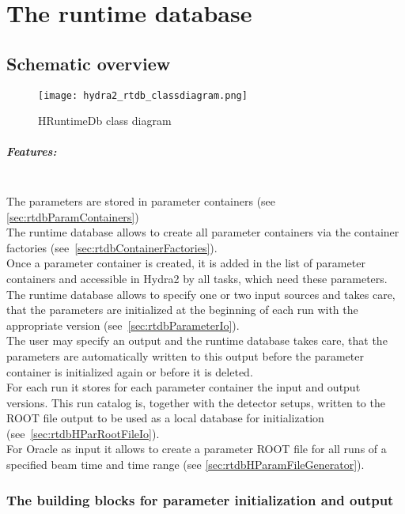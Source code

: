 \chapter[The runtime database]{The runtime database} \label{ch:rtdb}

\section{Schematic overview}

\begin{figure}[\htb]
  \centering
  \texttt{[image: hydra2\_rtdb\_classdiagram.png]}
  \caption[HRuntimeDb class diagram]{HRuntimeDb class diagram} \label{fig:rtdbHRuntimeDbClassDiagram}
\end{figure}

\paragraph{Features:} ~\\
The parameters are stored in parameter containers (see \ref{sec:rtdbParamContainers})\\
The runtime database allows to create all parameter containers via the container factories 
(see~\ref{sec:rtdbContainerFactories}).\\
Once a parameter container is created, it is added in the list of parameter containers and accessible in Hydra2 by all 
tasks, which need these parameters.\\
The runtime database allows to specify one or two input sources and takes care, that the parameters are initialized at 
the beginning of each run with the appropriate version (see~\ref{sec:rtdbParameterIo}). \\
The user may specify an output and the runtime database takes care, that the parameters are automatically written to   
this output before the parameter container is initialized again or before it is deleted.\\
For each run it stores for each parameter container the input and output versions. This run catalog is, together 
with the detector setups, written to the ROOT file output to be used as a local database for initialization 
(see~\ref{sec:rtdbHParRootFileIo}).\\
For Oracle as input it allows to create a parameter ROOT file for all runs of a specified beam time and time range 
(see \ref{sec:rtdbHParamFileGenerator}).

\subsection[The building blocks for parameter initialization and output]
           {The building blocks for parameter initialization and output}

